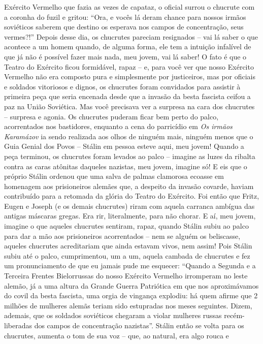 Exército Vermelho que fazia as vezes de capataz, o oficial surrou o
chucrute com a coronha do fuzil e gritou: ``Ora, e vocês lá deram chance
para nossos irmãos soviéticos saberem que destino os esperava nos campos
de concentração, seus vermes?!'' Depois desse dia, os chucrutes pareciam
resignados -- vai lá saber o que acontece a um homem quando, de alguma
forma, ele tem a intuição infalível de que já não é possível fazer mais
nada, meu jovem, vai lá saber! O fato é que o Teatro do Exército ficou
formidável, rapaz -- e, para você ver que nosso Exército Vermelho não
era composto pura e simplesmente por justiceiros, mas por oficiais e
soldados vitoriosos e dignos, os chucrutes foram convidados para
assistir à primeira peça que seria encenada desde que a invasão da besta
fascista ceifou a paz na União Soviética. Mas você precisava ver a
surpresa na cara dos chucrutes -- surpresa e agonia. Os chucrutes
puderam ficar bem perto do palco, acorrentados nos bastidores, enquanto
a cena do parricídio em \emph{Os irmãos Karamázov} ia sendo realizada
aos olhos de ninguém mais, ninguém menos que o Guia Genial dos Povos --
Stálin em pessoa esteve aqui, meu jovem! Quando a peça terminou, os
chucrutes foram levados ao palco -- imagine as luzes da ribalta contra
as caras atônitas daqueles nazistas, meu jovem, imagine só! E eis que o
próprio Stálin ordenou que uma salva de palmas clamorosa ecoasse em
homenagem aos prisioneiros alemães que, a despeito da invasão covarde,
haviam contribuído para a retomada da glória do Teatro do Exército. Foi
então que Fritz, Eugen e Joseph (e os demais chucrutes) riram com aquela
carranca ambígua das antigas máscaras gregas. Era rir, literalmente,
para não chorar. E aí, meu jovem, imagine o que aqueles chucrutes
sentiram, rapaz, quando Stálin subiu ao palco para dar a mão aos
prisioneiros acorrentados -- nem se alguém os beliscasse, aqueles
chucrutes acreditariam que ainda estavam vivos, nem assim! Pois Stálin
subiu até o palco, cumprimentou, um a um, aquela cambada de chucrutes e
fez um pronunciamento de que eu jamais pude me esquecer: ``Quando a
Segunda e a Terceira Frentes Bielorrussas do nosso Exército Vermelho
irromperam no leste alemão, já a uma altura da Grande Guerra Patriótica
em que nos aproximávamos do covil da besta fascista, uma orgia de
vingança explodiu: há quem afirme que 2 milhões de mulheres alemãs
teriam sido estupradas nos meses seguintes. Dizem, ademais, que os
soldados soviéticos chegaram a violar mulheres russas recém-liberadas
dos campos de concentração nazistas''. Stálin então se volta para os
chucrutes, aumenta o tom de sua voz -- que, ao natural, era algo rouca e
